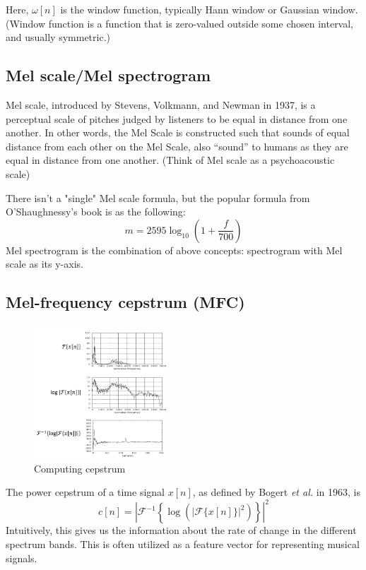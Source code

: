 \documentclass{article}
\theoremstyle{plain}
\theoremstyle{definition}
\theoremstyle{remark}
\begin{document}
	Here, $\omega[n]$ is the window function, typically Hann window or Gaussian window.
	(Window function is a function that is zero-valued outside some chosen interval, and usually symmetric.)

	
\subsection{Mel scale/Mel spectrogram}
	Mel scale, introduced by Stevens, Volkmann, and Newman in 1937, is a perceptual scale of pitches judged by listeners to be equal in distance from one another.
	In other words, the Mel Scale is constructed such that sounds of equal distance from each other on the Mel Scale, also “sound” to humans as they are equal in distance from one another.	
	(Think of Mel scale as a psychoacoustic scale)

	There isn't a "single" Mel scale formula, but the popular formula from O'Shaughnessy's book is as the following:
	$$m = 2595 \log_{10} \left( 1 + \frac{f}{700} \right)$$	
	Mel spectrogram is the combination of above concepts: spectrogram with Mel scale as its y-axis.


\subsection{Mel-frequency cepstrum (MFC)}

\begin{figure}
  \begin{center}
    \includegraphics[height=5cm]{fig2.png}
  \end{center}
    \caption{Computing cepstrum}
\end{figure}

	The power cepstrum of a time signal $x[n]$, as defined by Bogert {\it et al.} in 1963, is 
	$$c[n] = \left| \mathcal{F}^{-1} \left\{ \log \left( |\mathcal{F} \{x[n]\}|^2 \right) \right\} \right|^2$$
	Intuitively, this gives us the information about the rate of change in the different spectrum bands.
	This is often utilized as a feature vector for representing musical signals.
	
\end{document}
